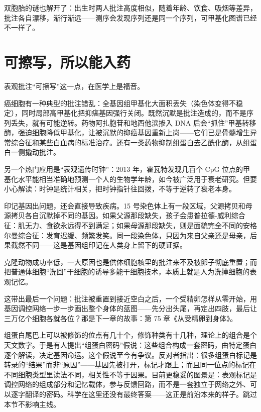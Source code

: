 双胞胎的谜也解开了：出生时两人批注高度相似，随着年龄、饮食、吸烟等差异，批注各自漂移，渐行渐远——测序会发现序列还是同一个序列，可甲基化图谱已经不一样了。

\section{可擦写，所以能入药}

表观批注“可擦写”这一点，在医学上是福音。

癌细胞有一种典型的批注错乱：全基因组甲基化大面积丢失（染色体变得不稳定），同时局部高甲基化把抑癌基因强行关闭。既然沉默是批注造成的，而不是序列丢失，就有可能逆转。药物阿扎胞苷和地西他滨掺入 DNA 后会“抓住”甲基转移酶，强迫细胞降低甲基化，让被沉默的抑癌基因重新上岗——它们已是骨髓增生异常综合征和某些白血病的标准治疗。还有一类药物抑制组蛋白去乙酰化酶，从组蛋白一侧撬动批注。

另一个热门应用是“表观遗传时钟”：2013 年，霍瓦特发现几百个 CpG 位点的甲基化水平能相当准确地预测一个人的生物学年龄，如今被广泛用于衰老研究。但要小心解读：时钟是统计相关，把时钟指针往回拨，不等于逆转了衰老本身。

印记基因出问题，还会直接导致疾病。15 号染色体上有一段区域，父源拷贝和母源拷贝各自沉默掉不同的基因。如果父源那段缺失，孩子会患普拉德-威利综合征：肌无力、食欲永远得不到满足；如果母源那段缺失，则是面貌完全不同的安格尔曼综合征：发育迟缓、频繁发笑。同一段染色体，只因为来自父亲还是母亲，后果截然不同——这是基因组印记在人类身上留下的硬证据。

克隆动物成功率低，一大原因也是供体细胞核里的批注来不及被卵子彻底重置；而把普通体细胞“洗回”干细胞的诱导多能干细胞技术，本质上就是人为洗掉细胞的表观记忆。

这带出最后一个问题：批注被重置到接近空白之后，一个受精卵怎样从零开始，用基因调控网络一步一步画出整个身体的蓝图——先分出头尾，再定出四肢，最后让三万亿个细胞各就各位？那是下一章的故事：第 75 章《从受精卵到身体》。

\begin{tiaozhan}
组蛋白尾巴上可以被修饰的位点有几十个，修饰种类有十几种，理论上的组合是个天文数字。于是有人提出“组蛋白密码”假说：这些组合构成一套密码，由特定蛋白逐个解读，决定基因命运。这个假说至今有争议。反对者指出：很多组蛋白标记是转录的“结果”而非“原因”——基因先被打开，标记才跟上；而且同一位点的标记在不同细胞类型里读法不同，相关性不等于因果。目前更稳妥的图景是：表观标记是调控网络的组成部分和记忆载体，参与反馈回路，而不是一套独立于网络之外、可以逐字翻译的密码。科学在这里还没有最终答案——这正是前沿本来的样子。跳过本节不影响主线。
\end{tiaozhan}

